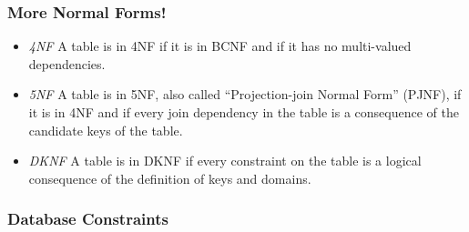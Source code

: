 \documentclass[xcolor=dvipsnames]{beamer}
\begin{document}
\begin{frame}[fragile]
  \frametitle{More Normal Forms!}

  \vfill

  \begin{itemize}
  \item \textit{\Large 4NF} A table is in 4NF if it is in BCNF and if it has
    no multi-valued dependencies.
    \newline

  \item \textit{\Large 5NF} A table is in 5NF, also called “Projection-join
    Normal Form” (PJNF), if it is in 4NF and if every join dependency in the
    table is a consequence of the candidate keys of the table.
    \newline
    
   \item \textit{\Large DKNF} A table is in DKNF if every constraint on the
     table is a logical consequence of the definition of keys and domains.
  \end{itemize}
\end{frame}

{
 
  \begin{frame}
    \frametitle{Database Constraints}

  \end{frame}
}
\end{document}
